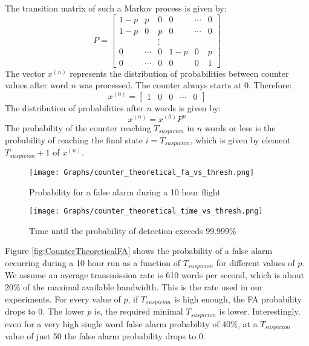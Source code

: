 \documentclass[compsoc,conference,a4paper]{IEEEtran}
\begin{document}
  The transition matrix of such a Markov process is given by:
  \begin{equation}
    P = \begin{bmatrix}
      1 - p & p     & 0      & 0 & \cdots & 0 \\
      1 - p & 0     & p      & 0 & \cdots & 0 \\
            &       & \vdots &   &       &   \\
      0     & \cdots & 0 & 1 - p  & 0 & p     \\
      0     & \cdots & 0 & 0      & 0 & 1
    \end{bmatrix}
  \end{equation}
  The vector \(x^{(n)}\) represents the distribution of probabilities between counter values after word $n$ was processed. The counter always starts at 0. Therefore:
  \begin{equation}
    x^{(0)} = \begin{bmatrix}
    1 & 0 & 0 & \cdots & 0
    \end{bmatrix}
  \end{equation}
  The distribution of probabilities after $n$ words is given by:
  \begin{equation} \label{eq:prob_after_n_words}
    x^{(n)} = x^{(0)}P^n
  \end{equation}
   The probability of the counter reaching $T_{suspicion}$ in $n$ words or less is the probability of reaching the final state $i = T_{suspicion}$, which is given by element $T_{suspicion} + 1$ of $x^{(n)}$.
   
  \begin{figure}[t]
    \centering
    \texttt{[image: Graphs/counter\_theoretical\_fa\_vs\_thresh.png]}
    \caption{Probability for a false alarm during a 10 hour flight}
    \label{fig:CounterTheoreticalFA}
    
    \texttt{[image: Graphs/counter\_theoretical\_time\_vs\_thresh.png]}
    \caption{Time until the probability of detection exceeds 99.999\%}
    \label{fig:CounterTheoreticalTime}
  \end{figure}

  Figure \ref{fig:CounterTheoreticalFA} shows the probability of a false alarm occurring during a 10 hour run as a function of $T_{suspicion}$ for different values of $p$. We assume an average transmission rate is 610 words per second, which is about 20\% of the maximal available bandwidth. This is the rate used in our experiments. For every value of $p$, if $T_{suspicion}$ is high enough, the FA probability drops to 0. The lower $p$ is, the required minimal $T_{suspicion}$ is lower. Interestingly, even for a very high single word false alarm probability of 40\%, at a $T_{suspicion}$ value of just 50 the false alarm probability drops to 0.
   
\end{document}
